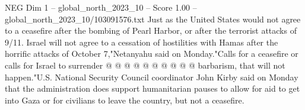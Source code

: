 \begin{textsample}{NEG Dim 1 – global\_north\_2023\_10 – Score 1.00 – global\_north\_2023\_10/103091576.txt}
Just as the United States would not agree to a ceasefire after the bombing of Pearl Harbor, or after the terrorist attacks of 9/11.
Israel will not agree to a cessation of hostilities with Hamas after the horrific attacks of October 7,"Netanyahu said on Monday."Calls for a ceasefire or calls for Israel to surrender @ @ @ @ @ @ @ @ @ @ barbarism, that will not happen."U.S.
National Security Council coordinator John Kirby said on Monday that the administration does support humanitarian pauses to allow for aid to get into Gaza or for civilians to leave the country, but not a ceasefire.

\end{textsample}
